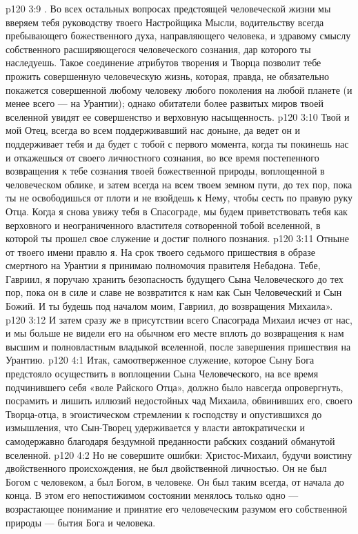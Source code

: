 \vs p120 3:9 \pc . Во всех остальных вопросах предстоящей человеческой жизни мы вверяем тебя руководству твоего Настройщика Мысли, водительству всегда пребывающего божественного духа, направляющего человека, и здравому смыслу собственного расширяющегося человеческого сознания, дар которого ты наследуешь. Такое соединение атрибутов творения и Творца позволит тебе прожить совершенную человеческую жизнь, которая, правда, не обязательно покажется совершенной любому человеку любого поколения на любой планете (и менее всего --- на Урантии); однако обитатели более развитых миров твоей вселенной увидят ее совершенство и верховную насыщенность.
\vs p120 3:10 Твой и мой Отец, всегда во всем поддерживавший нас доныне, да ведет он и поддерживает тебя и да будет с тобой с первого момента, когда ты покинешь нас и откажешься от своего личностного сознания, во все время постепенного возвращения к тебе сознания твоей божественной природы, воплощенной в человеческом облике, и затем всегда на всем твоем земном пути, до тех пор, пока ты не освободишься от плоти и не взойдешь к Нему, чтобы сесть по правую руку Отца. Когда я снова увижу тебя в Спасограде, мы будем приветствовать тебя как верховного и неограниченного властителя сотворенной тобой вселенной, в которой ты прошел свое служение и достиг полного познания.
\vs p120 3:11 Отныне от твоего имени правлю я. На срок твоего седьмого пришествия в образе смертного на Урантии я принимаю полномочия правителя Небадона. Тебе, Гавриил, я поручаю хранить безопасность будущего Сына Человеческого до тех пор, пока он в силе и славе не возвратится к нам как Сын Человеческий и Сын Божий. И ты будешь под началом моим, Гавриил, до возвращения Михаила».
\separatorline
\vs p120 3:12 И затем сразу же в присутствии всего Спасограда Михаил исчез от нас, и мы больше не видели его на обычном его месте вплоть до возвращения к нам высшим и полновластным владыкой вселенной, после завершения пришествия на Урантию.
\vs p120 4:1 Итак, самоотверженное служение, которое Сыну Бога предстояло осуществить в воплощении Сына Человеческого, на все время подчинившего себя «воле Райского Отца», должно было навсегда опровергнуть, посрамить и лишить иллюзий недостойных чад Михаила, обвинивших его, своего Творца\hyp{}отца, в эгоистическом стремлении к господству и опустившихся до измышления, что Сын\hyp{}Творец удерживается у власти автократически и самодержавно благодаря бездумной преданности рабских созданий обманутой вселенной.
\vs p120 4:2 \pc Но не совершите ошибки: Христос\hyp{}Михаил, будучи воистину двойственного происхождения, не был двойственной личностью. Он не был Богом  с человеком, а был Богом,  в человеке. Он был таким всегда, от начала до конца. В этом его непостижимом состоянии менялось только одно --- возрастающее понимание и принятие его человеческим разумом его собственной природы --- бытия Бога и человека.
